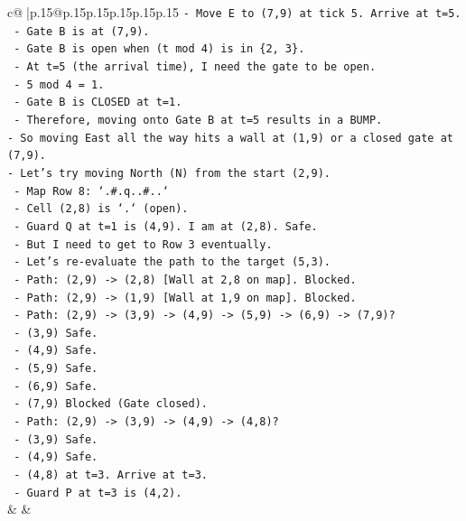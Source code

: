 \documentclass{article}
\begin{document}
{\begin{supertabular}{c@{$\;$}|p{.15\linewidth}@{}p{.15\linewidth}p{.15\linewidth}p{.15\linewidth}p{.15\linewidth}p{.15\linewidth}}
{{{\texttt{{-} Move E to (7,9) at tick 5. Arrive at t=5.} \\
\texttt{  {-} Gate B is at (7,9).} \\
\texttt{  {-} Gate B is open when (t mod 4) is in \{2, 3\}.} \\
\texttt{  {-} At t=5 (the arrival time), I need the gate to be open.} \\
\texttt{  {-} 5 mod 4 = 1.} \\
\texttt{  {-} Gate B is CLOSED at t=1.} \\
\texttt{  {-} Therefore, moving onto Gate B at t=5 results in a BUMP.} \\
\texttt{{-} So moving East all the way hits a wall at (1,9) or a closed gate at (7,9).} \\
\texttt{{-} Let's try moving North (N) from the start (2,9).} \\
\texttt{  {-} Map Row 8: `.\#.q..\#..`} \\
\texttt{  {-} Cell (2,8) is `.` (open).} \\
\texttt{  {-} Guard Q at t=1 is (4,9). I am at (2,8). Safe.} \\
\texttt{  {-} But I need to get to Row 3 eventually.} \\
\texttt{  {-} Let's re{-}evaluate the path to the target (5,3).} \\
\texttt{  {-} Path: (2,9) {-}> (2,8) {[}Wall at 2,8 on map{]}. Blocked.} \\
\texttt{  {-} Path: (2,9) {-}> (1,9) {[}Wall at 1,9 on map{]}. Blocked.} \\
\texttt{  {-} Path: (2,9) {-}> (3,9) {-}> (4,9) {-}> (5,9) {-}> (6,9) {-}> (7,9)?} \\
\texttt{    {-} (3,9) Safe.} \\
\texttt{    {-} (4,9) Safe.} \\
\texttt{    {-} (5,9) Safe.} \\
\texttt{    {-} (6,9) Safe.} \\
\texttt{    {-} (7,9) Blocked (Gate closed).} \\
\texttt{  {-} Path: (2,9) {-}> (3,9) {-}> (4,9) {-}> (4,8)?} \\
\texttt{    {-} (3,9) Safe.} \\
\texttt{    {-} (4,9) Safe.} \\
\texttt{    {-} (4,8) at t=3. Arrive at t=3.} \\
\texttt{      {-} Guard P at t=3 is (4,2).} \\
            }
        }
    }
    & & \\ \\


\end{supertabular}}
\end{document}
